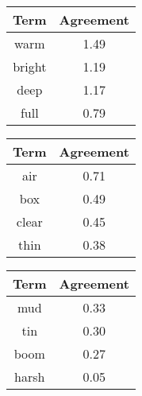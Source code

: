 \begin{tabular}{|c|c|}
	\hline
	\bf{Term} & \bf{Agreement} \tabularnewline
	\hline
	\hline
	warm & 1.49 \tabularnewline
	\hline
	bright & 1.19 \tabularnewline
	\hline
	deep & 1.17 \tabularnewline
	\hline
	full & 0.79 \tabularnewline
	\hline
\end{tabular}
\qquad
\begin{tabular}{|c|c|}
	\hline
	\bf{Term} & \bf{Agreement} \tabularnewline
	\hline
	\hline
	air & 0.71 \tabularnewline
	\hline
	box & 0.49 \tabularnewline
	\hline
	clear & 0.45 \tabularnewline
	\hline
	thin & 0.38 \tabularnewline
	\hline
\end{tabular}
\qquad
\begin{tabular}{|c|c|}
	\hline
	\bf{Term} & \bf{Agreement} \tabularnewline
	\hline
	\hline
	mud & 0.33 \tabularnewline
	\hline
	tin & 0.30 \tabularnewline
	\hline
	boom & 0.27 \tabularnewline
	\hline
	harsh & 0.05 \tabularnewline
	\hline
\end{tabular}
